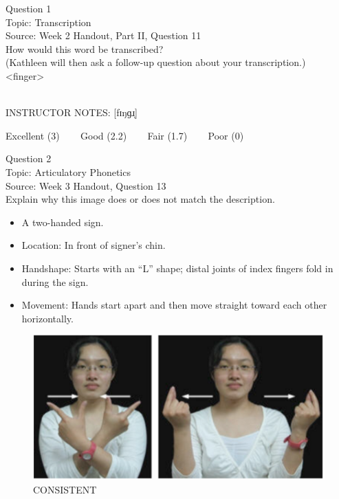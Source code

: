 \documentclass[12pt]{article}
\begin{document}
{\large Question 1}\\

Topic: Transcription\\
Source: Week 2 Handout, Part II, Question 11\\

How would this word be transcribed?\\ (Kathleen will then ask a follow-up question about your transcription.)\\

<finger>


~\\
INSTRUCTOR NOTES: [fɪŋɡɹ̩]


\vfill
Excellent (3) ~~~ Good (2.2) ~~~ Fair (1.7) ~~~ Poor (0)
\newpage

{\large Question 2}\\

Topic: Articulatory Phonetics\\
Source: Week 3 Handout, Question 13\\

Explain why this image does or does not match the description.\\

\begin{itemize} \item A two-handed sign. \item Location: In front of signer’s chin. \item Handshape: Starts with an “L” shape; distal joints of index fingers fold in during the sign. \item Movement: Hands start apart and then move straight toward each other horizontally. \end{itemize}

\begin{figure}[H]
\includegraphics{../images/taiwansign_consistent.png}
\caption{CONSISTENT}
\end{figure}
\end{document}
